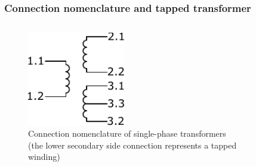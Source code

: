 \begin{frame}
	\frametitle{Connection nomenclature and tapped transformer}
	\begin{columns}[b]
		\begin{column}{0.45\textwidth}
			\begin{figure}
				\includegraphics[width=0.45\textwidth]{fig/lec04/Connection_nomenclature_single_phase_transformer.pdf}
				\vspace{1cm}
				\caption{Connection nomenclature of single-phase transformers (the lower secondary side connection represents a tapped winding)}
				\label{fig:Connection_nomenclature_single_phase_transformer}
			\end{figure}
		\end{column}
        \hfill
		\begin{column}{0.55\textwidth}
			\begin{figure}

\end{figure}
\end{column}
\end{columns}
\end{frame}
